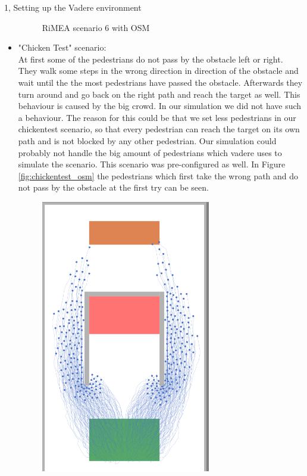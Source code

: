 \documentclass[10pt,a4paper]{article}
\begin{document}
\begin{task}{1, Setting up the Vadere environment}
\begin{itemize}
\begin{figure}[H]
        \caption{RiMEA scenario 6 with OSM}
        \label{fig:rimea6_osm}
    \end{figure}
    \item "Chicken Test" scenario: \\
    At first some of the pedestrians do not pass by the obstacle left or right. They walk some steps in the wrong direction in direction of the obstacle and wait until the the most pedestrians have passed the obstacle. Afterwards they turn around and go back on the right path and reach the target as well. This behaviour is caused by the big crowd. In our simulation we did not have such a behaviour. The reason for this could be that we set less pedestrians in our chickentest scenario, so that every pedestrian can reach the target on its own path and is not blocked by any other pedestrian. Our simulation could probably not handle the big amount of pedestrians which vadere uses to simulate the scenario. This scenario was pre-configured as well. In Figure \ref{fig:chickentest_osm} the pedestrians which first take the wrong path and do not pass by the obstacle at the first try can be seen.
    \begin{figure}[H]
        \centering
        \includegraphics[width=0.7\textwidth]{pictures/osm/chickentest.png}

\end{figure}
\end{itemize}
\end{task}
\end{document}
